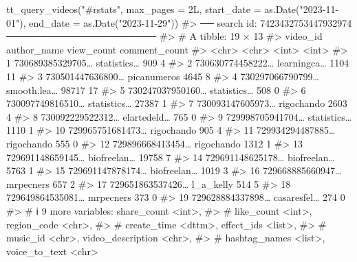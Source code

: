 \documentclass[
  nobib]{ccr}
\newenvironment{Shaded}{\begin{snugshade}}{\end{snugshade}}
\newcommand{\AttributeTok}[1]{\textcolor[rgb]{0.40,0.45,0.13}{#1}}
\newcommand{\CommentTok}[1]{\textcolor[rgb]{0.37,0.37,0.37}{#1}}
\newcommand{\DecValTok}[1]{\textcolor[rgb]{0.68,0.00,0.00}{#1}}
\newcommand{\FunctionTok}[1]{\textcolor[rgb]{0.28,0.35,0.67}{#1}}
\newcommand{\NormalTok}[1]{\textcolor[rgb]{0.00,0.23,0.31}{#1}}
\newcommand{\StringTok}[1]{\textcolor[rgb]{0.13,0.47,0.30}{#1}}
\begin{document}
\begin{Shaded}
\begin{Highlighting}[]
\FunctionTok{tt\_query\_videos}\NormalTok{(}\StringTok{"\#rstats"}\NormalTok{,}
                \AttributeTok{max\_pages =} \DecValTok{2}\NormalTok{L,}
                \AttributeTok{start\_date =} \FunctionTok{as.Date}\NormalTok{(}\StringTok{"2023{-}11{-}01"}\NormalTok{),}
                \AttributeTok{end\_date =} \FunctionTok{as.Date}\NormalTok{(}\StringTok{"2023{-}11{-}29"}\NormalTok{))}
\CommentTok{\#\textgreater{} ── search id: 7423432753447932974 ──────────────────────}
\CommentTok{\#\textgreater{} \# A tibble: 19 × 13}
\CommentTok{\#\textgreater{}    video\_id         author\_name view\_count comment\_count}
\CommentTok{\#\textgreater{}    \textless{}chr\textgreater{}            \textless{}chr\textgreater{}            \textless{}int\textgreater{}         \textless{}int\textgreater{}}
\CommentTok{\#\textgreater{}  1 730689385329705… statistics…        909             4}
\CommentTok{\#\textgreater{}  2 730630774458222… learningca…       1104            11}
\CommentTok{\#\textgreater{}  3 730501447636800… picanumeros       4645             8}
\CommentTok{\#\textgreater{}  4 730297066790799… smooth.lea…      98717            17}
\CommentTok{\#\textgreater{}  5 730247037950160… statistics…        508             0}
\CommentTok{\#\textgreater{}  6 730097749816510… statistics…      27387             1}
\CommentTok{\#\textgreater{}  7 730093147605973… rigochando        2603             4}
\CommentTok{\#\textgreater{}  8 730092229522312… elartedeld…        765             0}
\CommentTok{\#\textgreater{}  9 729998705941704… statistics…       1110             1}
\CommentTok{\#\textgreater{} 10 729965751681473… rigochando         905             4}
\CommentTok{\#\textgreater{} 11 729934294487885… rigochando         555             0}
\CommentTok{\#\textgreater{} 12 729896668413454… rigochando        1312             1}
\CommentTok{\#\textgreater{} 13 729691148659145… biofreelan…      19758             7}
\CommentTok{\#\textgreater{} 14 729691148625178… biofreelan…       5763             1}
\CommentTok{\#\textgreater{} 15 729691147878174… biofreelan…       1019             3}
\CommentTok{\#\textgreater{} 16 729668885660947… mrpecners          657             2}
\CommentTok{\#\textgreater{} 17 729651863537426… l\_a\_kelly          514             5}
\CommentTok{\#\textgreater{} 18 729649864535081… mrpecners          373             0}
\CommentTok{\#\textgreater{} 19 729628884337898… casaresfel…        274             0}
\CommentTok{\#\textgreater{} \# ℹ 9 more variables: share\_count \textless{}int\textgreater{},}
\CommentTok{\#\textgreater{} \#   like\_count \textless{}int\textgreater{}, region\_code \textless{}chr\textgreater{},}
\CommentTok{\#\textgreater{} \#   create\_time \textless{}dttm\textgreater{}, effect\_ids \textless{}list\textgreater{},}
\CommentTok{\#\textgreater{} \#   music\_id \textless{}chr\textgreater{}, video\_description \textless{}chr\textgreater{},}
\CommentTok{\#\textgreater{} \#   hashtag\_names \textless{}list\textgreater{}, voice\_to\_text \textless{}chr\textgreater{}}
\end{Highlighting}
\end{Shaded}
\end{document}
